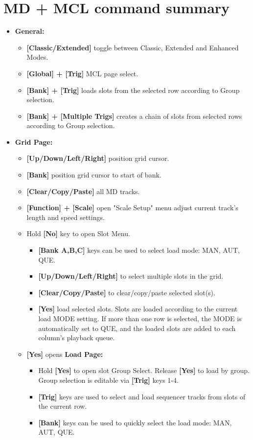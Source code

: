 \section{MD + MCL command summary}
\begin{itemize}
\item \textbf{General:}
   \begin{itemize}
      \item \textbf{[Classic/Extended] } toggle between Classic, Extended and Enhanced Modes.
      \item \textbf{[Global] + [Trig] } MCL page select.
      \item \textbf{[Bank] + [Trig]} loads slots from the selected row according to Group selection.
      \item \textbf{[Bank] + [Multiple Trigs]} creates a chain of slots from selected rows according to Group selection.
   \end{itemize}

\item \textbf{Grid Page:}
    \begin{itemize}
      \item \textbf{[Up/Down/Left/Right]} position grid cursor.
      \item \textbf{[Bank]} position grid cursor to start of bank.
      \item \textbf{[Clear/Copy/Paste]} all MD tracks.
      \item \textbf{[Function] + [Scale]} open "Scale Setup" menu adjust current track's length and speed settings.
      \item Hold \textbf{[No]} key to open Slot Menu.
      \begin{itemize}
                \item \textbf{[Bank A,B,C]} keys can be used to select load mode: MAN, AUT, QUE.
                \item \textbf{[Up/Down/Left/Right]} to select multiple slots in the grid.
                \item \textbf{[Clear/Copy/Paste]} to clear/copy/paste selected slot(s).
                \item \textbf{[Yes]} load selected slots. Slots are loaded according to the current load MODE setting. If more than one row is selected, the MODE is automatically set to QUE, and the loaded slots are added to each column's playback queue.                
      \end{itemize}

\item \textbf{[Yes]} opens \textbf{Load Page:}
    \begin{itemize}
    \item Hold \textbf{[Yes]} to open slot Group Select. Release \textbf{[Yes]} to load by group. Group selection is editable via \textbf{[Trig]} keys 1-4.
    \item \textbf{[Trig]} keys are used to select and load sequencer tracks from slots of the current row.
    \item \textbf{[Bank]} keys can be used to quickly select the load mode: MAN, AUT, QUE.
    \end{itemize}
    

\end{itemize}
\end{itemize}

